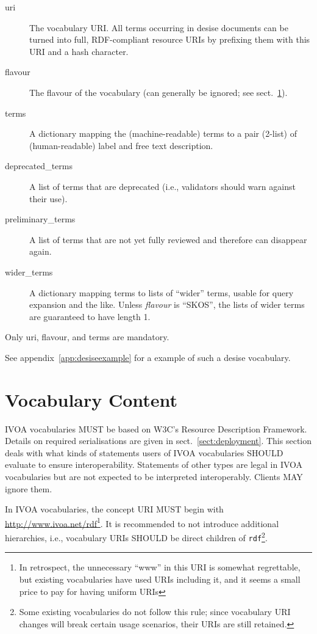 \documentclass[11pt,a4paper]{ivoa}
\begin{document}
\begin{description}
\item[uri] The vocabulary URI.  All terms occurring in desise documents
can be turned into full, RDF-compliant resource URIs by prefixing them
with this URI and a hash character.
\item[flavour] The flavour of the vocabulary (can generally be ignored;
see sect.~\ref{sect:voccontent}).
\item[terms] A dictionary mapping the (machine-readable) terms to a pair
(2-list) of (human-readable) label and free text description.
\item[deprecated\_terms] A list of terms that are deprecated (i.e.,
validators should warn against their use).
\item[preliminary\_terms] A list of terms that are not yet fully
reviewed and therefore can disappear again.
\item[wider\_terms] A dictionary mapping terms to lists of ``wider''
terms, usable for query expansion and the like.  Unless \emph{flavour}
is ``SKOS'', the lists of wider terms are guaranteed to have length 1.
\end{description}

Only uri, flavour, and terms are mandatory.

See appendix~\ref{app:desiseexample} for a example of such a
desise vocabulary.

\section{Vocabulary Content}
\label{sect:voccontent}

IVOA vocabularies MUST be based on W3C's Resource Description Framework.
Details on required serialisations are given in
sect.~\ref{sect:deployment}.  This section deals with what kinds of
statements users of IVOA vocabularies SHOULD evaluate to ensure
interoperability.   Statements of other types are legal in IVOA
vocabularies but are not expected to be interpreted interoperably.
Clients MAY ignore them.

In IVOA vocabularies, the concept URI MUST begin with
\url{http://www.ivoa.net/rdf}\footnote{In retrospect, the unnecessary
``www'' in this URI is somewhat regrettable, but existing vocabularies
have used URIs including it, and it seems a small price to pay for
having uniform URIs}.  It is recommended to not introduce
additional hierarchies, i.e., vocabulary URIs SHOULD be direct children
of \texttt{rdf}\footnote{Some existing vocabularies do not follow this
rule; since vocabulary URI changes will break certain usage scenarios,
their URIs are still retained.}.
\end{document}
